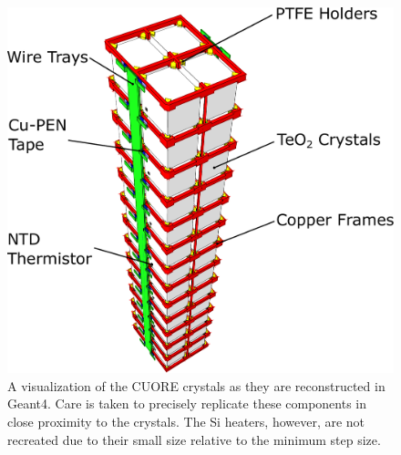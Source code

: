 \begin{figure}[htbp]
    \centering
    \includegraphics[height=0.3\paperheight]{Figures/Crystals_rotated_labelled.pdf}
    \caption[A visualization of the CUORE crystals as they are reconstructed in Geant4]
    {A visualization of the CUORE crystals as they are reconstructed in Geant4.
    Care is taken to precisely replicate these components in close proximity to the crystals.
    The Si heaters, however, are not recreated due to their small size relative to the minimum step size.}
    \label{fig:CUORE_crystals_MC}
\end{figure}

